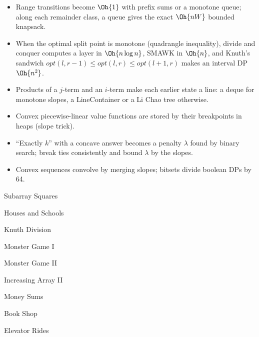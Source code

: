 \begin{summary}
\begin{itemize}
  \item Range transitions become $\Oh{1}$ with prefix sums or a monotone queue; along each remainder class, a queue gives the exact
        $\Oh{nW}$ bounded knapsack.
  \item When the optimal split point is monotone (quadrangle inequality), divide and conquer computes a layer in $\Oh{n \log n}$,
        SMAWK in $\Oh{n}$, and Knuth's sandwich $\mathit{opt}(l, r-1) \le \mathit{opt}(l, r) \le \mathit{opt}(l+1, r)$ makes an
        interval DP $\Oh{n^2}$.
  \item Products of a $j$-term and an $i$-term make each earlier state a line: a deque for monotone slopes, a LineContainer or a Li
        Chao tree otherwise.
  \item Convex piecewise-linear value functions are stored by their breakpoints in heaps (slope trick).
  \item ``Exactly $k$'' with a concave answer becomes a penalty $\lambda$ found by binary search; break ties consistently and bound
        $\lambda$ by the slopes.
  \item Convex sequences convolve by merging slopes; bitsets divide boolean DPs by 64.
\end{itemize}
\end{summary}

\begin{practice}
\begin{pplist}
  \item Subarray Squares
  \item Houses and Schools
  \item Knuth Division
  \item Monster Game I
  \item Monster Game II
  \item Increasing Array II
  \item Money Sums
  \item Book Shop
  \item Elevator Rides
\end{pplist}
\end{practice}
